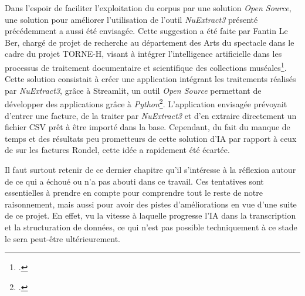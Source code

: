 Dans l'espoir de faciliter l'exploitation du corpus par une solution \emph{Open Source}, une solution pour améliorer l'utilisation de l'outil \emph{NuExtract3} présenté précédemment a aussi été envisagée. Cette suggestion a été faite par Fantin Le Ber, chargé de projet de recherche au département des Arts du spectacle dans le cadre du projet TORNE-H, visant à intégrer l'intelligence artificielle dans les processus de traitement documentaire et scientifique des collections muséales\footcite{noauthor_torne-h_nodate}. Cette solution consistait à créer une application intégrant les traitements réalisés par \emph{NuExtract3}, grâce à Streamlit, un outil \emph{Open Source} permettant de développer des applications grâce à \emph{Python}\footcite{noauthor_streamlit_nodate}. L'application envisagée prévoyait d'entrer une facture, de la traiter par \emph{NuExtract3} et d'en extraire directement un fichier CSV prêt à être importé dans la base. Cependant, du fait du manque de temps et des résultats peu prometteurs de cette solution d'IA par rapport à ceux de  sur les factures Rondel, cette idée a rapidement été écartée. 

Il faut surtout retenir de ce dernier chapitre qu'il s'intéresse à la réflexion autour de ce qui a échoué ou n'a pas abouti dans ce travail. Ces tentatives sont essentielles à prendre en compte pour comprendre tout le reste de notre raisonnement, mais aussi pour avoir des pistes d'améliorations en vue d'une suite de ce projet. En effet, vu la vitesse à laquelle progresse l'IA dans la transcription et la structuration de données, ce qui n'est pas possible techniquement à ce stade le sera peut-être ultérieurement. 